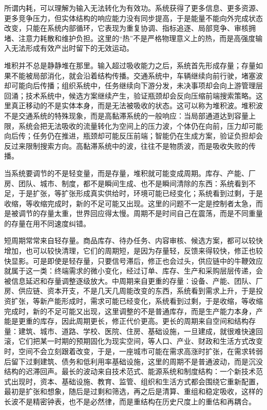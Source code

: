 所谓内耗，可以理解为输入无法转化为有效功。系统获得了更多信息、更多资源、更多竞争压力，但实体结构的响应能力没有同步提高，于是能量不能向外完成状态改变，只能在系统内部循环，它表现为重复协调、指标追逐、局部竞争、审核拥堵、注意力耗散和维护负担。这里的“热”不是严格物理意义上的热，而是高强度输入无法形成有效产出时留下的无效运动。


堆积并不总是静静堆在那里。输入超过吸收能力之后，系统首先形成存量；存量如果不能被局部消化，就会沿着结构传播。交通系统中，车辆继续向前行驶，堵塞波却可能向后传播；组织系统中，任务继续向下游分发，未决事项却会向上游管理层回涌；技术系统中，候选方案继续产生，验证瓶颈却会反向压缩前端搜索策略。这里真正移动的不是实体本身，而是无法被吸收的状态。这可以称为堆积波。堆积波不是交通系统的特殊现象，而是高黏滞系统的一般响应：当局部通道达到容量上限，系统会把无法吸收的流量转化为空间上的压力波，个体仍在向前，压力却可能向后传；任务仍在推进，瓶颈却可能反压前端；智能仍在生成方案，验证负担却会反过来限制搜索方向。高黏滞系统中的波，往往不是物质波，而是吸收失败的传播。

当系统要调节的不是轻变量，而是存量，堆积就可能变成周期。库存、产能、厂房、团队、城市、制度，都不是瞬间生成、也不是瞬间清除的东西：系统看到不足，于是扩张，等扩张形成真实供给时，环境可能已经变化；系统看到过剩，于是收缩，等收缩完成时，新的不足可能又出现。这里的问题不一定是控制者太急，而是被调节的存量太重，世界回应得太慢。周期不是时间自己在震荡，而是不同重量的存量在用不同速度纠错。

短周期常常来自轻存量。商品库存、待办任务、内容审核、候选方案，都可以较快增加，也可以较快清理，它们的周期短，是因为存量轻，反馈来得较快，修正也较快显影。可是即使是轻存量，只要信号滞后，修正也会过头，供应链中的牛鞭效应就属于这一类：终端需求的微小变化，经过订单、库存、生产和采购层层传递，会被信息延迟和存量调整逐级放大\cite{lee1997information}。中周期来自更重的存量：设备、产能、团队、厂房、供应链、资本开支，不是几天几周能改变的东西，系统看到需求上升，于是投资扩张，等新产能形成时，需求可能已经变化，系统看到过剩，于是收缩，等收缩完成时，新的不足可能又出现，这里调整的不是普通库存，而是生产能力本身，产能是更重的库存，因此周期更长，修正代价更高。更长的周期来自空间和结构存量：建筑、城市、道路、学校、医院、住房、基础设施，一旦建成，就很难快速回滚，它们把某一时期的预期固化为现实空间，等人口、产业、财政和生活方式改变时，空间不会立刻跟着改变，于是，一座城市可能在需求高涨时扩张，在需求转弱后留下过剩建筑、债务和低利用率基础设施，这里的周期不是普通波动，而是沉没结构的迟滞回声。最长的波动来自技术范式、能源系统和制度结构：一个新技术范式出现时，资本、基础设施、教育、监管、组织和生活方式都会围绕它重新配置，最初是扩张和想象，随后是过剩和筛选，再之后是清算、重组和稳定吸收，这样的长波不是精密钟表，也不是必然律，而是重结构在历史尺度上的重估和再耦合。

